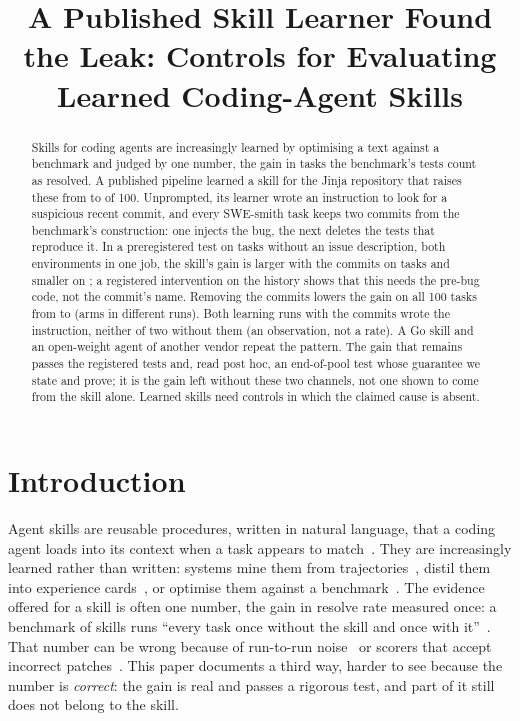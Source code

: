 \documentclass[sigconf,review,anonymous]{acmart}
\begin{document}
\title{A Published Skill Learner Found the Leak: Controls for Evaluating Learned Coding-Agent Skills}

\begin{abstract}
Skills for coding agents are increasingly learned by optimising a text against a benchmark and
judged by one number, the gain in tasks the benchmark's tests count as resolved. A published
pipeline learned a skill for the Jinja repository that raises these from \njinjaNone{} to
\njinjaSkill{} of 100. Unprompted, its learner wrote an instruction to look for a suspicious recent
commit, and every SWE-smith task keeps two commits from the benchmark's construction: one injects the
bug, the next deletes the tests that reproduce it. In a preregistered test on \ncfN{} tasks without
an issue description, both environments in one job, the skill's gain is larger with the commits on
\ncfFor{} tasks and smaller on \ncfAgainst{}; a registered intervention on the history shows that
this needs the pre-bug code, not the commit's name. Removing the commits lowers the gain on all 100
tasks from \njinjaGain{} to \njinjaLFGain{} (arms in different runs). Both learning runs with the commits wrote the
instruction, neither of two without them (an observation, not a rate). A Go skill and an open-weight agent of another vendor
repeat the pattern. The gain that remains passes the registered tests and, read post hoc, an
end-of-pool test whose guarantee we state and prove; it is the gain left without these two channels,
not one shown to come from the skill alone. Learned skills need controls in which the claimed cause
is absent.
\end{abstract}
\maketitle

\section{Introduction}
Agent skills are reusable procedures, written in natural language, that a coding agent loads into
its context when a task appears to match~\cite{agent_skills}. They are increasingly learned rather
than written: systems mine them from trajectories~\cite{xreposkill}, distil them into experience
cards~\cite{memgovern_repo}, or optimise them against a benchmark~\cite{gskill}. The evidence
offered for a skill is often one number, the gain in resolve rate measured once: a benchmark of
skills runs ``every task once without the skill and once with it''~\cite{sskb_paper}. That number
can be wrong because of run-to-run noise~\cite{randomness_agentic_evals_2026} or scorers that
accept incorrect patches~\cite{patchdiff_2025,utboost_acl}. This paper documents a third way,
harder to see because the number is \emph{correct}: the gain is real and passes a rigorous test,
and part of it still does not belong to the skill.
\end{document}
